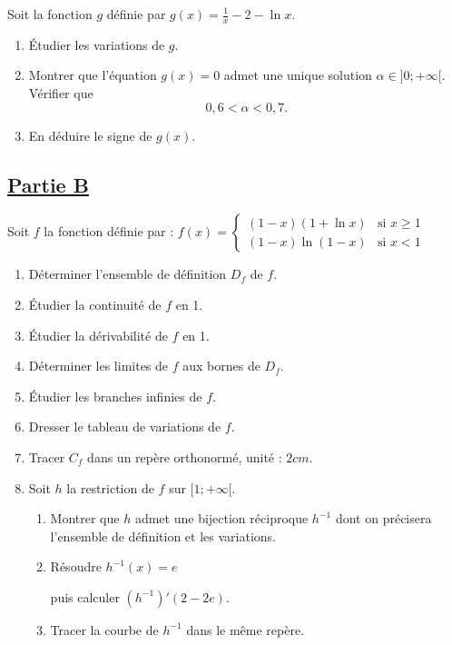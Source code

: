 \documentclass[12pt,a4paper]{article}
\begin{document}
Soit la fonction \( g \) définie par  \( g(x) = \frac{1}{x} - 2 - \ln x. \)

\begin{enumerate}
    \item Étudier les variations de \( g \).
    \item Montrer que l’équation \( g(x) = 0 \) admet une unique solution \( \alpha \in ]0; +\infty[ \). Vérifier que
          \[
              0,6 < \alpha < 0,7.
          \]
    \item En déduire le signe de \( g(x) \).
\end{enumerate}

\subsection*{\underline{\textbf{Partie B}}}

Soit \( f \) la fonction définie par :
\(
f(x) =
\begin{cases}
    (1 - x)(1 + \ln x) & \text{si } x \geq 1 \\
    (1 - x) \ln(1 - x) & \text{si } x < 1
\end{cases}
\)

\begin{enumerate}
    \item Déterminer l’ensemble de définition \( D_f \) de \( f \).
    \item Étudier la continuité de \( f \) en 1.
    \item Étudier la dérivabilité de \( f \) en 1.
    \item Déterminer les limites de \( f \) aux bornes de \( D_f \).
    \item Étudier les branches infinies de \( f \).
    \item Dresser le tableau de variations de \( f \).
    \item Tracer \( C_f \) dans un repère orthonormé, unité : \( 2cm \).
    \item Soit \( h \) la restriction de \( f \) sur \( [1; +\infty[ \).
          \begin{enumerate}
              \item Montrer que \( h \) admet une bijection réciproque \( h^{-1} \) dont on précisera l’ensemble de définition et les variations.
              \item Résoudre  \(  h^{-1}(x) = e \)

                    puis calculer  \(  (h^{-1})'(2 - 2e). \)

              \item Tracer la courbe de \( h^{-1} \) dans le même repère.
          \end{enumerate}
\end{enumerate}
\end{document}
